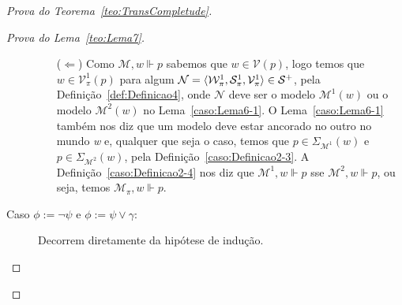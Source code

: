 \begin{apendicesenv}
\begin{proof}[Prova do Teorema~\ref{teo:TransCompletude}]
\begin{proof}[Prova do Lema~\ref{teo:Lema7}]
\begin{description}
\begin{itemize}
                        \item[(\(\Leftarrow\))] Como \(\mathcal{M}, w \Vdash p\) sabemos que \(w \in \mathcal{V}(p)\), logo temos que \(w \in \mathcal{V}_{\pi}^{1}(p)\)
                            para algum \(\mathcal{N} = \langle \mathcal{W}_{\pi}^{1}, \mathcal{S}_{\pi}^{1}, \mathcal{V}_{\pi}^{1} \rangle \in \mathcal{S}^{+}\),
                            pela Definição~\ref{def:Definicao4}, onde \(\mathcal{N}\) deve ser o modelo \(\mathcal{M}^{1}(w)\) ou o modelo \(\mathcal{M}^{2}(w)\) no Lema~\ref{caso:Lema6-1}.
                            O Lema~\ref{caso:Lema6-1} também nos diz que um modelo deve estar ancorado no outro no mundo \textit{w} e, qualquer que seja o caso, temos que
                            \(p \in \Sigma_{\mathcal{M}^{1}}(w)\) e \(p \in \Sigma_{\mathcal{M}^{2}}(w)\), pela Definição~\ref{caso:Definicao2-3}.
                            A Definição~\ref{caso:Definicao2-4} nos diz que \(\mathcal{M}^{1}, w \Vdash p\) sse \(\mathcal{M}^{2}, w \Vdash p\), ou seja,
                            temos \(\mathcal{M}_{\pi}, w \Vdash p\).
                    \end{itemize}

                    \item[\textnormal{Caso \(\phi := \neg \psi\) e \(\phi := \psi \lor \gamma\):}] Decorrem diretamente da hipótese de indução.



\end{description}
\end{proof}
\end{proof}
\end{apendicesenv}
